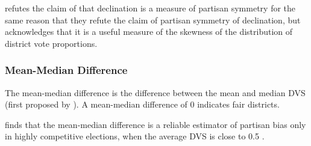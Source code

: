 \textcite{katz2020} refutes the claim of \textcite{warrington2018} that declination is a measure of partisan symmetry for the same reason that they refute the claim of partisan symmetry of declination, but acknowledges that it is a useful measure of the skewness of the distribution of district vote proportions. 

\subsubsection{Mean-Median Difference}
\label{sec:meanmed}

The mean-median difference is the difference between the mean and median DVS (first proposed by \textcite{mcdonald2015}). A mean-median difference of 0 indicates fair districts. 

\textcite{katz2020} finds that the mean-median difference is a reliable estimator of partisan bias only in highly competitive elections, when the average DVS is close to 0.5 \parencite[27-9]{katz2020}.
